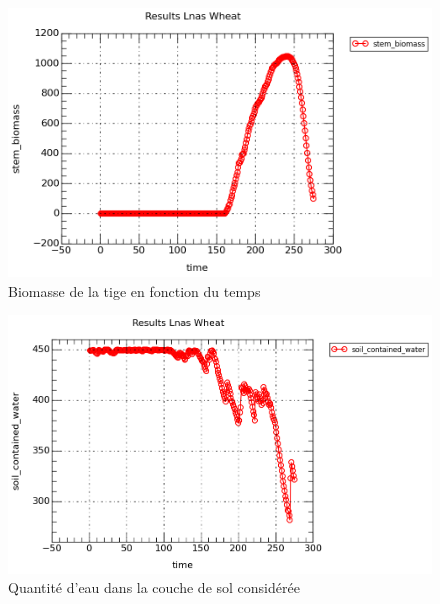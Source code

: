 \begin{figure}[H]

\begin{center}
 \includegraphics[scale = 0.63]{./img/stem.png}
 \caption{Biomasse de la tige en fonction du temps}
 \label{fig:resultatStem}
\end{center}

\end{figure}

\begin{figure}[H]

\begin{center}
 \includegraphics[scale = 0.63]{./img/water.png}
 \caption{Quantité d'eau dans la couche de sol considérée}
 \label{fig:resultatWater}
\end{center}
\end{figure}

